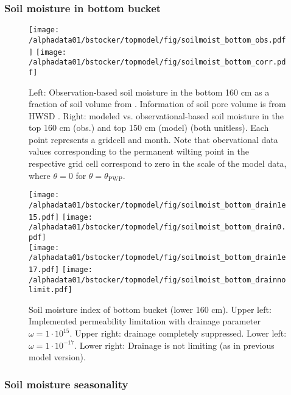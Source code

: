 \clearpage
\subsubsection{Soil moisture in bottom bucket}

\begin{figure}[ht!]
\begin{center}
  \texttt{[image: /alphadata01/bstocker/topmodel/fig/soilmoist\_bottom\_obs.pdf]}
  \texttt{[image: /alphadata01/bstocker/topmodel/fig/soilmoist\_bottom\_corr.pdf]}
\end{center}
\caption{Left: Observation-based soil moisture in the bottom 160 cm as a fraction of soil volume from \citep{rodell04bams}. Information of soil pore volume is from HWSD \citep{hwsd}. Right: modeled vs. observational-based soil moisture in the top 160 cm (obs.) and top 150 cm (model) (both unitless). Each point represents a gridcell and month. Note that obervational data values corresponding to the permanent wilting point in the respective grid cell correspond to zero in the scale of the model data, where $\theta=0$ for $\theta=\theta_{\text{PWP}}$.}
\label{fig:soilmoist_bottom_obs}
\end{figure}

\begin{figure}[ht!]
\begin{center}
  \texttt{[image: /alphadata01/bstocker/topmodel/fig/soilmoist\_bottom\_drain1e15.pdf]}
  \texttt{[image: /alphadata01/bstocker/topmodel/fig/soilmoist\_bottom\_drain0.pdf]}\\
  \texttt{[image: /alphadata01/bstocker/topmodel/fig/soilmoist\_bottom\_drain1e17.pdf]}
  \texttt{[image: /alphadata01/bstocker/topmodel/fig/soilmoist\_bottom\_drainnolimit.pdf]}
\end{center}
\caption{Soil moisture index of bottom bucket (lower 160 cm). Upper left: Implemented permeability limitation with drainage parameter $\omega=1\cdot 10^{15}$. Upper right: drainage completely suppressed. Lower left: $\omega=1\cdot 10^{-17}$. Lower right: Drainage is not limiting (as in previous model version).}
\label{fig:soilmoist_bottom}
\end{figure}

\clearpage
\subsubsection{Soil moisture seasonality}

